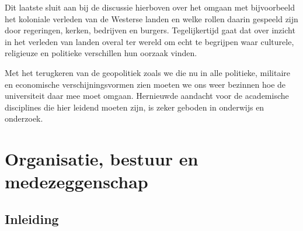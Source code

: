 \documentclass[smallauthor, chapterhaspagenum, nochapterinheader, pagenuminheader,  bigchapnum,medium2, tocpages, garamond, titleinheader]{jote-book}
\begin{document}
	Dit laatste sluit aan bij de discussie hierboven over het omgaan met bijvoorbeeld het koloniale verleden van de Westerse landen en welke rollen daarin gespeeld zijn door regeringen, kerken, bedrijven en burgers. Tegelijkertijd gaat dat over inzicht in het verleden van landen overal ter wereld om echt te begrijpen waar culturele, religieuze en politieke verschillen hun oorzaak vinden.



	Met het terugkeren van de geopolitiek zoals we die nu in alle politieke, militaire en economische verschijningsvormen zien moeten we ons weer bezinnen hoe de universiteit daar mee moet omgaan. Hernieuwde aandacht voor de academische disciplines die hier leidend moeten zijn, is zeker geboden in onderwijs en onderzoek.







	\chapter{Organisatie, bestuur en medezeggenschap}



	\section{Inleiding}
\end{document}
